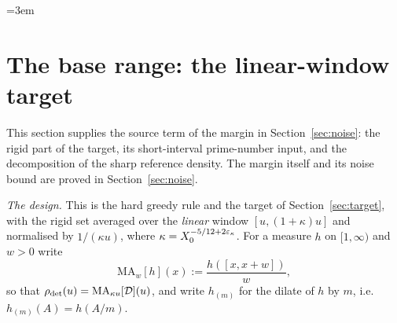 \begingroup\emergencystretch=3em %
\section{The base range: the linear-window target}\label{sec:baserange}

This section supplies the source term of the margin in Section~\ref{sec:noise}: the rigid part of the target, its short-interval
prime-number input, and the decomposition of the sharp reference density. The margin itself and its noise bound are proved in
Section~\ref{sec:noise}.

\emph{The design.} This is the hard greedy rule and the target of Section~\ref{sec:target}, with the rigid set averaged over the
\emph{linear} window $[u,(1+\kappa)u]$ and normalised by $1/(\kappa u)$, where $\kappa=X_0^{-5/12+2\varepsilon_\kappa}$. For a measure $h$ on
$[1,\infty)$ and $w>0$ write
\begin{equation}\label{eq:MA}
  \mathrm{MA}_w[h](x):=\frac{h([x,x+w])}{w},
\end{equation}
so that $\rho_{\mathrm{det}}(u)=\mathrm{MA}_{\kappa u}[\mathcal D](u)$, and write $h_{(m)}$ for the dilate of $h$ by $m$, i.e.\ $h_{(m)}(A)=h(A/m)$.

